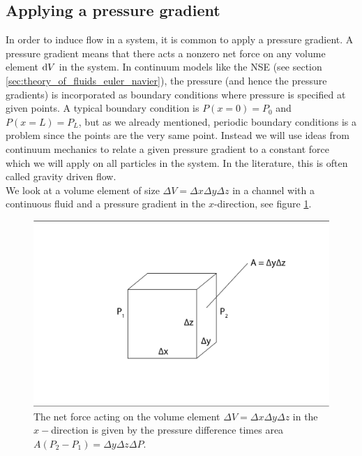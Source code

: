 \subsection{Applying a pressure gradient}
In order to induce flow in a system, it is common to apply a pressure gradient. A pressure gradient means that there acts a nonzero net force on any volume element $\mathrm{d}V$ in the system. In continuum models like the NSE (see section \ref{sec:theory_of_fluids_euler_navier}), the pressure (and hence the pressure gradients) is incorporated as boundary conditions where pressure is specified at given points. A typical boundary condition is $P(x=0) = P_0$ and $P(x=L) = P_L$, but as we already mentioned, periodic boundary conditions is a problem since the points are the very same point. Instead we will use ideas from continuum mechanics to relate a given pressure gradient to a constant force which we will apply on all particles in the system. In the literature, this is often called gravity driven flow.\\
We look at a volume element of size $\Delta V = \Delta x\Delta y\Delta z$ in a channel with a continuous fluid and a pressure gradient in the $x$-direction, see figure \ref{fig:pressure_gravity_equivalent}. 
\begin{figure}[h]
\begin{center}
\includegraphics[width=\textwidth, trim=0cm 0cm 0cm 0cm, clip]{DSMC/figures/pressure_to_gravity.eps}
\end{center}
\caption{The net force acting on the volume element $\Delta V = \Delta x\Delta y\Delta z$ in the $x-$direction is given by the pressure difference times area $A(P_2 - P_1) = \Delta y\Delta z\Delta P$.}
\label{fig:pressure_gravity_equivalent}
\end{figure}
